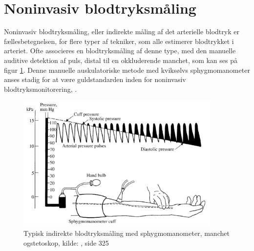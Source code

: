 \section{Noninvasiv blodtryksmåling}\label{noninvasivBloodpressureMeasurement}
Noninvasiv blodtryksmåling, eller indirekte måling af det arterielle blodtryk er fællesbetegnelsen, for flere typer af tekniker, som alle estimerer blodtrykket i arteriet. Ofte associeres en blodtryksmåling af denne type, med den manuelle auditive detektion af puls, distal til en okkluderende manchet, som kan ses på figur \ref{fig:audiotoryBloodpressureMeasurement}. Denne manuelle auskulatoriske metode med kviksølvs sphygmomanometer anses stadig for at være guldstandarden inden for noninvasiv blodtryksmonitorering, \cite{RefWorks:24} .

\begin{figure}[H]
	\includegraphics[width=0.9\textwidth]{billeder/TypicalIndirectBlood-pressureMeasurement.png}
	\caption{Typisk indirekte blodtryksmåling med sphygmomanometer, manchet ogstetoskop, kilde: \cite{RefWorks:27}, side 325}\label{fig:audiotoryBloodpressureMeasurement}
\end{figure}

